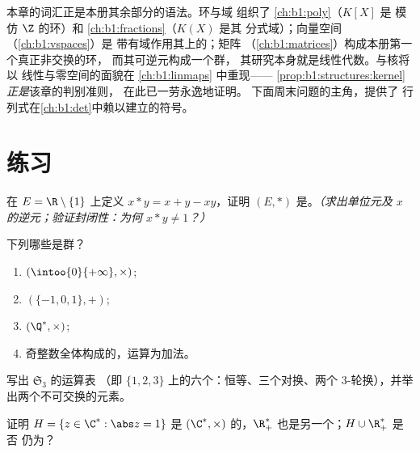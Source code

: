 \begin{remark}[本章的应用]\label{rem:b1:structures:whereused}
本章的词汇正是本册其余部分的语法。环与域
组织了 \cref{ch:b1:poly}（$K[X]$ 是
模仿 $\Z$ 的环）和 \cref{ch:b1:fractions}（$K(X)$ 是其
分式域）；向量空间（\cref{ch:b1:vspaces}）是
带有域作用其上的；矩阵
（\cref{ch:b1:matrices}）构成本册第一个真正非交换的环，
而其可逆元构成一个群，
其研究本身就是线性代数。与核将以
线性与零空间的面貌在 \cref{ch:b1:linmaps} 中重现——
\cref{prop:b1:structures:kernel} \emph{正是}该章的判别准则，
在此已一劳永逸地证明。
下面周末问题的主角，提供了
行列式在\cref{ch:b1:det}中赖以建立的符号。
\end{remark}

\section{练习}

\begin{exercise}[$\star$]\label{exo:b1:structures:1}
在 $E = \R \setminus \{1\}$ 上定义 $x * y = x + y - xy$，证明
$(E, *)$ 是。\emph{（求出单位元及
$x$ 的逆元；验证封闭性：为何 $x * y \neq 1$？）}
\end{exercise}

\begin{exercise}[$\star$]\label{exo:b1:structures:2}
下列哪些是群？
\begin{enumerate}
  \item $(\intoo{0}{+\infty}, \times)$;
  \item $(\{-1, 0, 1\}, +)$;
  \item $(\Q^*, \times)$;
  \item 奇整数全体构成的，运算为加法。
\end{enumerate}
\end{exercise}

\begin{exercise}[$\star$]\label{exo:b1:structures:3}
写出 $\mathfrak{S}_3$ 的运算表
（即 $\{1,2,3\}$ 上的六个：恒等、三个对换、两个
$3$-轮换），并举出两个不可交换的元素。
\end{exercise}

\begin{exercise}[$\star$]\label{exo:b1:structures:4}
证明 $H = \{z \in \C^* : \abs z = 1\}$ 是 $(\C^*,
\times)$ 的，$\R_+^*$ 也是另一个；$H \cup \R_+^*$ 是否
仍为？
\end{exercise}

